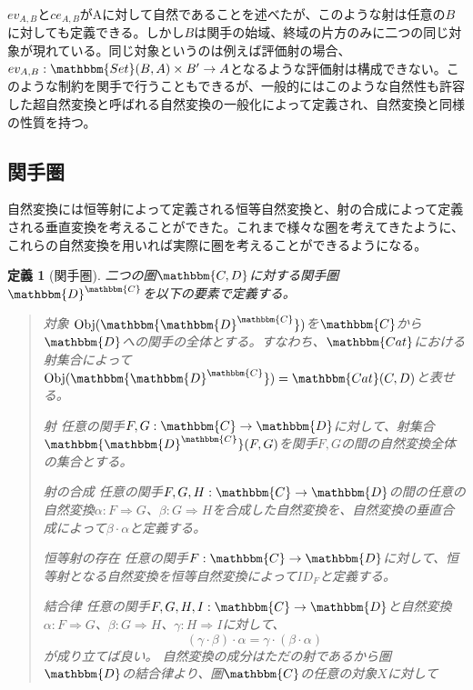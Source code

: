 \documentclass[uplatex,dvipdfmx]{jsarticle}
\newcommand{\cat}[1]{\mathbbm{#1}}
\newcommand{\arrow}{\rightarrow}
\newcommand{\functor}[3]{#1:\cat{#2}\arrow \cat{#3}}
\newcommand{\nat}[3]{#1:#2\Rightarrow #3}
\newcommand{\obj}[1]{\mathrm{Obj}(\cat{#1})}
\newcommand{\mor}[3]{#1:#2\arrow #3}
\newcommand{\arset}[3]{\cat{#1}(#2,#3)}
\newcommand{\funccat}[2]{\cat{#2}^\cat{#1}}
\newtheorem{define}[proof]{定義}
\numberwithin{proof}{subsection}
\newenvironment{mydescription}
{\begin{description}
  \setlength{\parskip}{0.5cm}
}
{\end{description}}
\begin{document}
  $ev_{A,B}$と$ce_{A,B}$がAに対して自然であることを述べたが、このような射は任意の$B$に対しても定義できる。しかし$B$は関手の始域、終域の片方のみに二つの同じ対象が現れている。同じ対象というのは例えば評価射の場合、$\mor{ev_{A,B}}{\arset{Set}{B}{A}\times B'}{A}$となるような評価射は構成できない。このような制約を関手で行うこともできるが、一般的にはこのような自然性も許容した超自然変換と呼ばれる自然変換の一般化によって定義され、自然変換と同様の性質を持つ。
	\subsection{関手圏}
	自然変換には恒等射によって定義される恒等自然変換と、射の合成によって定義される垂直変換を考えることができた。これまで様々な圏を考えてきたように、これらの自然変換を用いれば実際に圏を考えることができるようになる。
	\begin{define}[関手圏]
		二つの圏$\cat{C,D}$に対する関手圏$\funccat{C}{D}$を以下の要素で定義する。
		\begin{quote}
			\begin{mydescription}
				\item[対象] $\obj{\funccat{C}{D}}$を$\cat{C}$から$\cat{D}$への関手の全体とする。すなわち、$\cat{Cat}$における射集合によって$\obj{\funccat{C}{D}}=\arset{Cat}{C}{D}$と表せる。
				\item[射]任意の関手$\functor{F,G}{C}{D}$に対して、射集合$\arset{\funccat{C}{D}}{F}{G}$を関手$F,G$の間の自然変換全体の集合とする。
				\item[射の合成] 任意の関手$\functor{F,G,H}{C}{D}$の間の任意の自然変換$\nat{\alpha}{F}{G}$、$\nat{\beta}{G}{H}$を合成した自然変換を、自然変換の垂直合成によって$\beta\cdot\alpha$と定義する。
				\item[恒等射の存在]任意の関手$\functor{F}{C}{D}$に対して、恒等射となる自然変換を恒等自然変換によって$ID_F$と定義する。
				\item[結合律]任意の関手$\functor{F,G,H,I}{C}{D}$と自然変換$\nat{\alpha}{F}{G}$、$\nat{\beta}{G}{H}$、$\nat{\gamma}{H}{I}$に対して、\[(\gamma\cdot\beta)\cdot\alpha=\gamma\cdot(\beta\cdot\alpha)\]が成り立てば良い。
				自然変換の成分はただの射であるから圏$\cat{D}$の結合律より、圏$\cat{C}$の任意の対象$X$に対して


\end{mydescription}
\end{quote}
\end{define}
\end{document}
